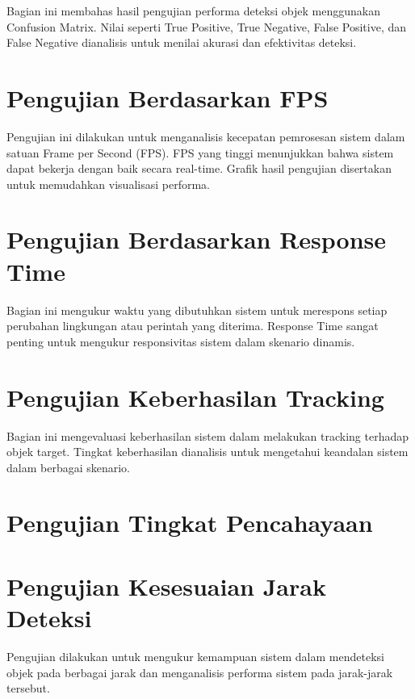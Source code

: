 Bagian ini membahas hasil pengujian performa deteksi objek menggunakan Confusion Matrix. Nilai seperti True Positive, True Negative, False Positive, dan False Negative dianalisis untuk menilai akurasi dan efektivitas deteksi.

\section{Pengujian Berdasarkan FPS}
\label{sec:pengujianberdasarkanfps}

Pengujian ini dilakukan untuk menganalisis kecepatan pemrosesan sistem dalam satuan Frame per Second (FPS). FPS yang tinggi menunjukkan bahwa sistem dapat bekerja dengan baik secara real-time. Grafik hasil pengujian disertakan untuk memudahkan visualisasi performa.

\section{Pengujian Berdasarkan Response Time}
\label{sec:pengujianberdasarkanresponsetime}

Bagian ini mengukur waktu yang dibutuhkan sistem untuk merespons setiap perubahan lingkungan atau perintah yang diterima. Response Time sangat penting untuk mengukur responsivitas sistem dalam skenario dinamis.

\section{Pengujian Keberhasilan Tracking}
\label{sec:pengujiankeberhasiltracking}

Bagian ini mengevaluasi keberhasilan sistem dalam melakukan tracking terhadap objek target. Tingkat keberhasilan dianalisis untuk mengetahui keandalan sistem dalam berbagai skenario.

\section{Pengujian Tingkat Pencahayaan}
\label{sec:pengujiantingkatpencahayaan}

\section{Pengujian Kesesuaian Jarak Deteksi}
\label{sec:pengujiankesesuaianjarakdeteksi}

Pengujian dilakukan untuk mengukur kemampuan sistem dalam mendeteksi objek pada berbagai jarak  dan menganalisis performa sistem pada jarak-jarak tersebut.

